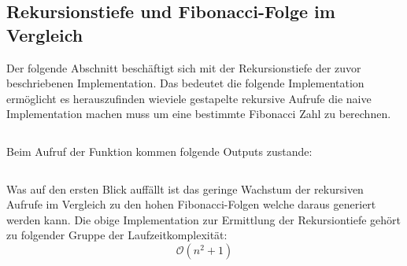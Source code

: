 \subsection{Rekursionstiefe und Fibonacci-Folge im Vergleich}
Der folgende Abschnitt beschäftigt sich mit der Rekursionstiefe
der zuvor beschriebenen Implementation. Das bedeutet die
folgende Implementation ermöglicht es herauszufinden wieviele
gestapelte rekursive Aufrufe die naive Implementation machen
muss um eine bestimmte Fibonacci Zahl zu berechnen.
\begin{mdframed}[backgroundcolor=bg]
    \inputminted{Python}{src/count_fibonacci.py}
\end{mdframed}
Beim Aufruf der Funktion kommen folgende Outputs zustande:
\begin{mdframed}[backgroundcolor=bg]
    \inputminted{Python}{src/count_fibonacci_test.py}
\end{mdframed}
Was auf den ersten Blick auffällt ist das geringe Wachstum 
der rekursiven Aufrufe im Vergleich zu den hohen Fibonacci-Folgen
welche daraus generiert werden kann. Die obige Implementation
zur Ermittlung der Rekursiontiefe gehört zu folgender 
Gruppe der Laufzeitkomplexität:
\begin{equation}
    \mathcal{O}(n^2 + 1)
\end{equation}